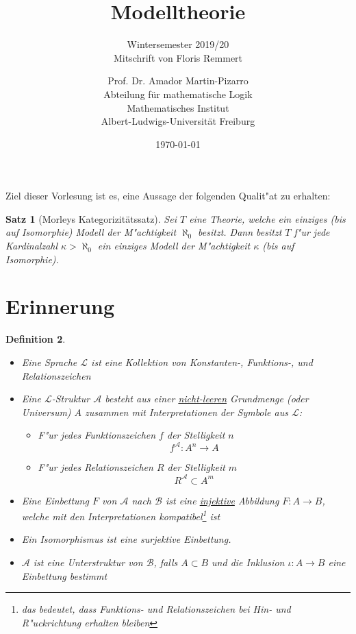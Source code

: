 \documentclass[a4paper,12pt,numbers=noenddot,parskip=full]{scrartcl}
\title{Modelltheorie}
\subtitle{Wintersemester 2019/20 \\ Mitschrift von Floris Remmert}
\author{Prof. Dr. Amador Martin-Pizarro\\Abteilung für mathematische Logik\\Mathematisches Institut\\Albert-Ludwigs-Universität Freiburg}
\date{\today}
\newcommand{\scrL}{\mathcal{L}}
\newcommand{\scrA}{\mathcal{A}}
\newcommand{\scrB}{\mathcal{B}}
\theoremstyle{dotless}
\newtheorem{theorem}{Satz}[section]
\newtheorem{definition}[theorem]{Definition}
\begin{document}
	\pagestyle{headings}
\begin{titlepage}
	\maketitle	
	\thispagestyle{empty}
\end{titlepage}
\newpage 
\thispagestyle{empty}
\quad 
\newpage
\tableofcontents 
\thispagestyle{empty}

\newpage
\setcounter{page}{1}
Ziel dieser Vorlesung ist es, eine Aussage der folgenden Qualit"at zu erhalten:
\begin{theorem}[Morleys Kategorizitätssatz]\label{morley}
	Sei $T$ eine Theorie, welche ein einziges (bis auf Isomorphie) Modell der M"achtigkeit $\aleph_0$ besitzt. Dann besitzt $T$ f"ur jede Kardinalzahl $\kappa > \aleph_0$ ein einziges Modell der M"achtigkeit $\kappa$ (bis auf Isomorphie).
\end{theorem}

\section{Erinnerung}
\begin{definition}
	\begin{itemize}
		\item Eine Sprache $\scrL$ ist eine Kollektion von Konstanten-, Funktions-, und Relationszeichen
		\item Eine $\scrL$-Struktur $\scrA$ besteht aus einer \underline{nicht-leeren} Grundmenge (oder Universum) $A$ zusammen mit Interpretationen der Symbole aus $\scrL$:
		\begin{itemize}
			\item F"ur jedes Funktionszeichen $f$ der Stelligkeit $n$ 
			\begin{equation*}
				f^\scrA : A^n \longrightarrow A
			\end{equation*}
			\item F"ur jedes Relationszeichen $R$ der Stelligkeit $m$
			\begin{equation*}
				R^\scrA \subset A^m
			\end{equation*}
		\end{itemize}
	\item Eine Einbettung $F$ von $\scrA$ nach $\scrB$ ist eine \underline{injektive} Abbildung $F: A \longrightarrow B$, welche mit den Interpretationen kompatibel\footnote{das bedeutet, dass Funktions- und Relationszeichen bei Hin- und R"uckrichtung erhalten bleiben} ist
	\item Ein Isomorphismus ist eine surjektive Einbettung.
	\item $\scrA$ ist eine Unterstruktur von $\scrB$, falls $A \subset B$ und die Inklusion $\iota : A \longrightarrow B$ eine Einbettung bestimmt
	\end{itemize}
\end{definition}
\end{document}
